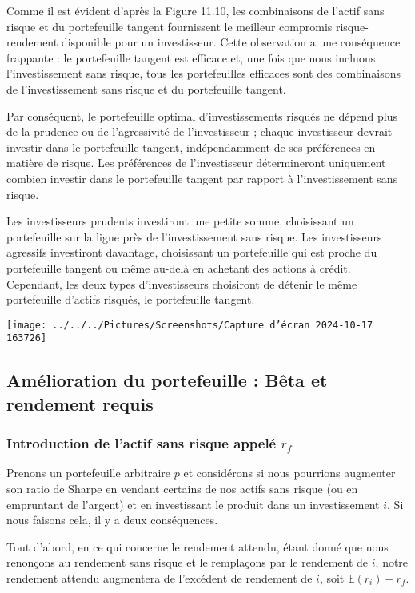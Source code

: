 \documentclass[a4paper, 12pt]{report}
\begin{document}
Comme il est évident d'après la Figure 11.10, les combinaisons de l'actif sans risque et du portefeuille tangent fournissent le meilleur compromis risque-rendement disponible pour un investisseur. Cette observation a une conséquence frappante : le portefeuille tangent est efficace et, une fois que nous incluons l'investissement sans risque, tous les portefeuilles efficaces sont des combinaisons de l'investissement sans risque et du portefeuille tangent.

Par conséquent, le portefeuille optimal d'investissements risqués ne dépend plus de la prudence ou de l'agressivité de l'investisseur ; chaque investisseur devrait investir dans le portefeuille tangent, indépendamment de ses préférences en matière de risque. Les préférences de l'investisseur détermineront uniquement combien investir dans le portefeuille tangent par rapport à l'investissement sans risque.

Les investisseurs prudents investiront une petite somme, choisissant un portefeuille sur la ligne près de l'investissement sans risque. Les investisseurs agressifs investiront davantage, choisissant un portefeuille qui est proche du portefeuille tangent ou même au-delà en achetant des actions à crédit. Cependant, les deux types d'investisseurs choisiront de détenir le même portefeuille d'actifs risqués, le portefeuille tangent.

\begin{center}
	\texttt{[image: ../../../Pictures/Screenshots/Capture d'écran 2024-10-17 163726]}
\end{center}

\subsection{Amélioration du portefeuille : Bêta et rendement requis}

\subsubsection{Introduction de l'actif sans risque appelé \( r_f \)}

Prenons un portefeuille arbitraire \( p \) et considérons si nous pourrions augmenter son ratio de Sharpe en vendant certains de nos actifs sans risque (ou en empruntant de l'argent) et en investissant le produit dans un investissement \( i \). Si nous faisons cela, il y a deux conséquences.

Tout d'abord, en ce qui concerne le rendement attendu, étant donné que nous renonçons au rendement sans risque et le remplaçons par le rendement de \( i \), notre rendement attendu augmentera de l'excédent de rendement de \( i \), soit \( \mathbb{E}(r_i) - r_f \).
\end{document}
